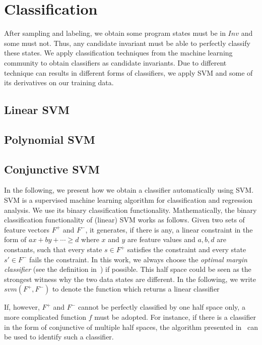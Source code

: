 
\section{Classification}
After sampling and labeling, we obtain some program states must be in $Inv$ and some must not. 
Thus, any candidate invariant must be able to perfectly classify these states. 
We apply classification techniques from the machine learning community to obtain classifiers as candidate invariants.
Due to different technique can results in different forms of classifiers,
we apply SVM and some of its derivatives on our training data. 

\subsection{Linear SVM}
\subsection{Polynomial SVM}
\subsection{Conjunctive SVM}
In the following, we present how we obtain a classifier automatically using SVM. 
SVM is a supervised machine learning algorithm for classification and regression analysis. 
We use its binary classification functionality. 
Mathematically, the binary classification functionality of (linear) SVM works as follows. 
Given two sets of feature vectors $F^+$ and $F^-$, it generates, if there is any, 
a linear constraint in the form of $ax + by + \cdots \geq d$ where $x$ and $y$ are feature values and $a, b, d$ are constants, 
such that every state $s \in F^+$ satisfies the constraint and every state $s' \in F^-$ fails the constraint. 
In this work, we always choose the \textit{optimal margin classifier} (see the definition in~\cite{Sharma2012}) if possible. 
This half space could be seen as the strongest witness why the two data states are different. 
In the following, we write $svm(F^+, F^-)$ to denote the function which returns a linear classifier

If, however, $F^+$ and $F^-$ cannot be perfectly classified by one half space only, 
a more complicated function $f$ must be adopted. 
For instance, if there is a classifier in the form of conjunctive of multiple half spaces, 
the algorithm presented in~\cite{Sharma2012} can be used to identify such a classifier.

